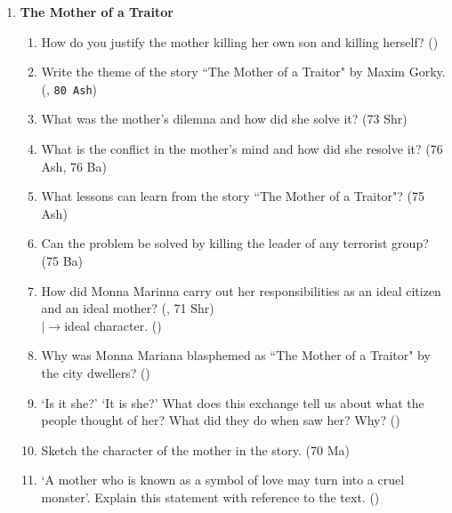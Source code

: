 \documentclass[12pt]{article}
\newcommand{\lb}{\\$\left|\rightarrow\right.$}
\begin{document}
\begin{enumerate}
\begin{enumerate}[noitemsep, topsep=0pt]
        \item St. Peter said ``all flesh is grass". Discuss. \hfill ()
      \end{enumerate}

      \item \textbf{The Mother of a Traitor}
      \begin{enumerate}
        \item How do you justify the mother killing her own son and killing herself? \hfill ()

        \item Write the theme of the story ``The Mother of a Traitor" by Maxim Gorky. \hfill (, \texttt{80 Ash})

        \item What was the mother's dilemna and how did she solve it? \hfill (73 Shr)

        \item What is the conflict in the mother's mind and how did she resolve it? \hfill (76 Ash, 76 Ba)

        \item What lessons can learn from the story ``The Mother of a Traitor"? \hfill (75 Ash)

        \item Can the problem be solved by killing the leader of any terrorist group? \hfill (75 Ba)

        \item How did Monna Marinna carry out her responsibilities as an ideal citizen and an ideal mother? \hfill (, 71 Shr)
          \lb ideal character. \hfill ()

        \item Why was Monna Mariana blasphemed as ``The Mother of a Traitor" by the city dwellers? \hfill ()

        \item `Is it she?' `It is she?' What does this exchange tell us about what the people thought of her? What did they do when saw her? Why? \hfill ()

        \item Sketch the character of the mother in the story. \hfill (70 Ma)

        \item `A mother who is known as a symbol of love may turn into a cruel monster'. Explain this statement with reference to the text. \hfill ()
      \end{enumerate}


\end{enumerate}
\end{document}
